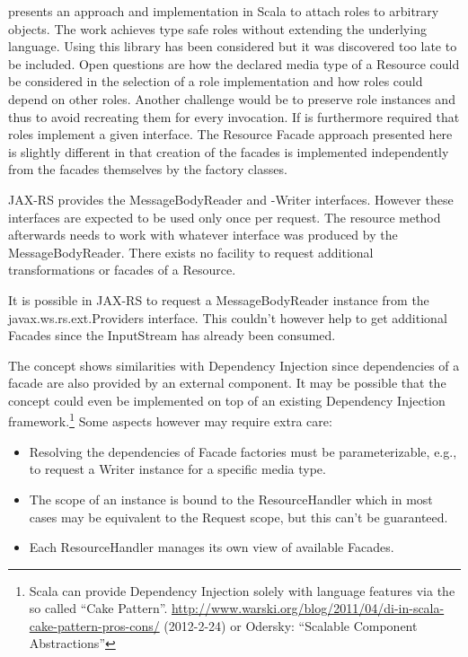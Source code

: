 \documentclass[11pt,a4paper,headsepline,twoside]{scrartcl}		%
\newcommand{\citeurl}[2]{\url{#1} (#2)}
\begin{document}
\cite{Pradel2008a} presents an approach and implementation in Scala to attach
roles to arbitrary objects. The work achieves type safe roles without extending
the underlying language. Using this library has been considered but it was
discovered too late to be included. Open questions are how the declared media
type of a Resource could be considered in the selection of a role implementation
and how roles could depend on other roles. Another challenge would be to
preserve role instances and thus to avoid recreating them for every
invocation. If is furthermore required that roles implement a given
interface. The Resource Facade approach presented here is slightly different in
that creation of the facades is implemented independently from the facades
themselves by the factory classes.

JAX-RS provides the MessageBodyReader and -Writer interfaces. However these
interfaces are expected to be used only once per request. The resource method
afterwards needs to work with whatever interface was produced by the
MessageBodyReader. There exists no facility to request additional
transformations or facades of a Resource.

It is possible in JAX-RS to request a MessageBodyReader instance from the
javax.ws.rs.ext.Providers interface. This couldn't however help to get
additional Facades since the InputStream has already been consumed.

The concept shows similarities with Dependency Injection since dependencies of a
facade are also provided by an external component. It may be possible that the
concept could even be implemented on top of an existing Dependency Injection
framework.\footnote{Scala can provide Dependency Injection solely with language
  features via the so called ``Cake
  Pattern''. \citeurl{http://www.warski.org/blog/2011/04/di-in-scala-cake-pattern-pros-cons/}{2012-2-24}
  or Odersky: ``Scalable Component Abstractions''} Some aspects however may
require extra care:

\begin{itemize}
\item Resolving the dependencies of Facade factories must be parameterizable,
  e.g., to request a Writer instance for a specific media type.
\item The scope of an instance is bound to the ResourceHandler which in most
  cases may be equivalent to the Request scope, but this can't be guaranteed.
\item Each ResourceHandler manages its own view of available Facades.
\end{itemize}
\end{document}
